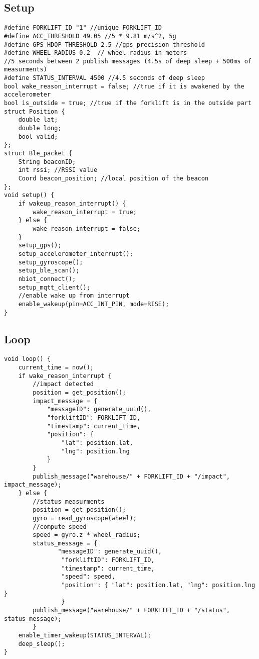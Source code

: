 \subsection{Setup}
\begin{verbatim}
#define FORKLIFT_ID "1" //unique FORKLIFT_ID 
#define ACC_THRESHOLD 49.05 //5 * 9.81 m/s^2, 5g
#define GPS_HDOP_THRESHOLD 2.5 //gps precision threshold 
#define WHEEL_RADIUS 0.2  // wheel radius in meters
//5 seconds between 2 publish messages (4.5s of deep sleep + 500ms of measurments)
#define STATUS_INTERVAL 4500 //4.5 seconds of deep sleep
bool wake_reason_interrupt = false; //true if it is awakened by the accelerometer
bool is_outside = true; //true if the forklift is in the outside part
struct Position {
    double lat;
    double long;
    bool valid;
};
struct Ble_packet {
    String beaconID;
    int rssi; //RSSI value
    Coord beacon_position; //local position of the beacon
};
void setup() {
    if wakeup_reason_interrupt() {
        wake_reason_interrupt = true;
    } else {
        wake_reason_interrupt = false;
    } 
    setup_gps();
    setup_accelerometer_interrupt();
    setup_gyroscope();
    setup_ble_scan();
    nbiot_connect();
    setup_mqtt_client();
    //enable wake up from interrupt
    enable_wakeup(pin=ACC_INT_PIN, mode=RISE);
}
\end{verbatim}
\pagebreak
\subsection{Loop}
\begin{verbatim}
void loop() {
    current_time = now();
    if wake_reason_interrupt {
        //impact detected
        position = get_position();
        impact_message = {
            "messageID": generate_uuid(),
            "forkliftID": FORKLIFT_ID,
            "timestamp": current_time,
            "position": {
                "lat": position.lat,
                "lng": position.lng
            }
        }
        publish_message("warehouse/" + FORKLIFT_ID + "/impact", impact_message);
    } else {
        //status measurments
        position = get_position();
        gyro = read_gyroscope(wheel);
        //compute speed
        speed = gyro.z * wheel_radius;
        status_message = {
               "messageID": generate_uuid(),
                "forkliftID": FORKLIFT_ID,
                "timestamp": current_time,
                "speed": speed,
                "position": { "lat": position.lat, "lng": position.lng }
                }
        publish_message("warehouse/" + FORKLIFT_ID + "/status", status_message);
        }
    enable_timer_wakeup(STATUS_INTERVAL);
    deep_sleep();
}
\end{verbatim}
\pagebreak
